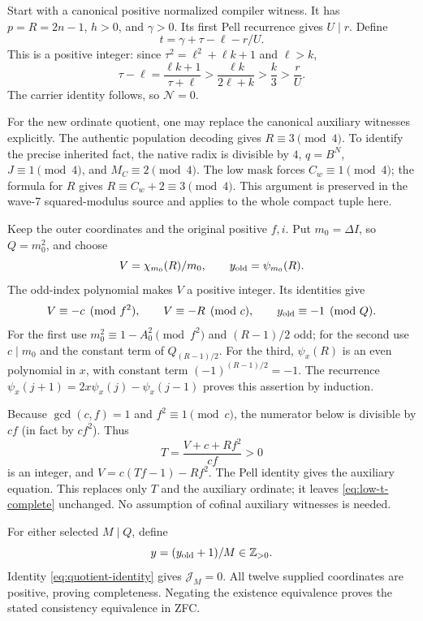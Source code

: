 Start with a canonical positive normalized compiler witness.  It has
$p=R=2n-1$, $h>0$, and $\gamma>0$.  Its first Pell recurrence gives
$U\mid r$.  Define
\begin{equation}
 t=\gamma+\tau-\ell-r/U.
 \label{eq:low-t-complete}
\end{equation}
This is a positive integer: since $\tau^2=\ell^2+\ell k+1$ and
$\ell>k$,
\[
 \tau-\ell=\frac{\ell k+1}{\tau+\ell}
 >\frac{\ell k}{2\ell+k}>\frac k3>\frac rU.
\]
The carrier identity follows, so $\mathcal N=0$.

For the new ordinate quotient, one may replace the canonical auxiliary
witnesses explicitly.  The authentic population decoding gives
$R\equiv3\pmod4$.  To identify the precise inherited fact, the native
radix is divisible by $4$, $q=B^N$, $J\equiv1\pmod4$, and
$M_C\equiv2\pmod4$.  The low mask forces $C_w\equiv1\pmod4$; the
formula for $R$ gives $R\equiv C_w+2\equiv3\pmod4$.  This argument is
preserved in the wave-7 squared-modulus source and applies to the whole
compact tuple here.

Keep the outer coordinates and the original positive $f,i$.  Put
$m_0=\Delta I$, so $Q=m_0^2$, and choose
\begin{equation}
 V=\chi_{m_0}(R)/m_0,\qquad
 y_{\rm old}=\psi_{m_0}(R).
 \label{eq:canonical-auxiliary}
\end{equation}
The odd-index polynomial makes $V$ a positive integer.  Its identities give
\begin{equation}
 V\equiv-c\pmod{f^2},\qquad
 V\equiv-R\pmod c,
 \qquad y_{\rm old}\equiv-1\pmod Q.
 \label{eq:canonical-residues}
\end{equation}
For the first use $m_0^2\equiv1-A_0^2\pmod{f^2}$ and
$(R-1)/2$ odd; for the second use $c\mid m_0$ and the constant term
of $Q_{(R-1)/2}$.  For the third, $\psi_x(R)$ is an even polynomial
in $x$, with constant term $(-1)^{(R-1)/2}=-1$.  The recurrence
$\psi_x(j+1)=2x\psi_x(j)-\psi_x(j-1)$ proves this assertion by induction.

Because $\gcd(c,f)=1$ and $f^2\equiv1\pmod c$, the numerator below is
divisible by $cf$ (in fact by $cf^2$).  Thus
\[
 T=\frac{V+c+Rf^2}{cf}>0
\]
is an integer, and $V=c(Tf-1)-Rf^2$.  The Pell identity gives the auxiliary
equation.  This replaces only $T$ and the auxiliary ordinate; it leaves
\eqref{eq:low-t-complete} unchanged.  No assumption of cofinal auxiliary
witnesses is needed.

For either selected $M\mid Q$, define
\[
 y=(y_{\rm old}+1)/M\in\mathbb Z_{>0}.
\]
Identity \eqref{eq:quotient-identity} gives $\mathcal J_M=0$.  All twelve
supplied coordinates are positive, proving completeness.  Negating the
existence equivalence proves the stated consistency equivalence in ZFC.

